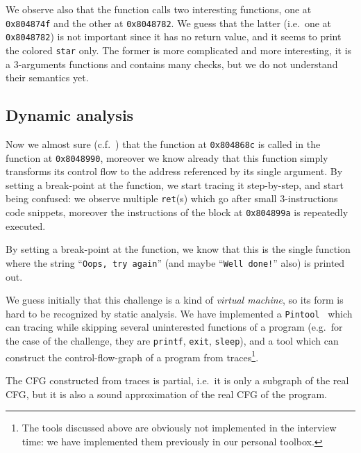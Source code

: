 \documentclass{easychair}
\begin{document}
We observe also that the function calls two interesting functions, one at \texttt{0x804874f} and the other at \texttt{0x8048782}. We guess that the latter (i.e.~one at \texttt{0x8048782}) is not important since it has no return value, and it seems to print the colored \texttt{star} only. The former is more complicated and more interesting, it is a $3$-arguments functions and contains many checks, but we do not understand their semantics yet.

\subsection{Dynamic analysis}
\label{sec:dynamic_analysis_quick}
Now we almost sure (c.f.~) that the function at \texttt{0x804868c} is called in the function at \texttt{0x8048990}, moreover we know already that this function simply transforms its control flow to the address referenced by its single argument. By setting a break-point at the function, we start tracing it step-by-step, and start being confused: we observe multiple \texttt{ret}(s) which go after small $3$-instructions code snippets, moreover the instructions of the block at \texttt{0x804899a} is repeatedly executed.

\begin{remark}\label{rem:print_out_location}
  By setting a break-point at the function, we know that this is the single function where the string ``\texttt{Oops, try again}'' (and maybe ``\texttt{Well done!}'' also) is printed out.
\end{remark}

We guess initially that this challenge is a kind of \emph{virtual machine}, so its form is hard to be recognized by static analysis. We have implemented a \texttt{Pintool}~\autocite{LukCMPKLWRH05} which can tracing while skipping several uninterested functions of a program (e.g.~for the case of the challenge, they are \texttt{printf}, \texttt{exit}, \texttt{sleep}), and a tool which can construct the control-flow-graph of a program from traces\footnote{The tools discussed above are obviously not implemented in the interview time: we have implemented them previously in our personal toolbox.}.

\begin{remark}
  The CFG constructed from traces is partial, i.e.~it is only a subgraph of the real CFG, but it is also a sound approximation of the real CFG of the program.
\end{remark}
\end{document}
